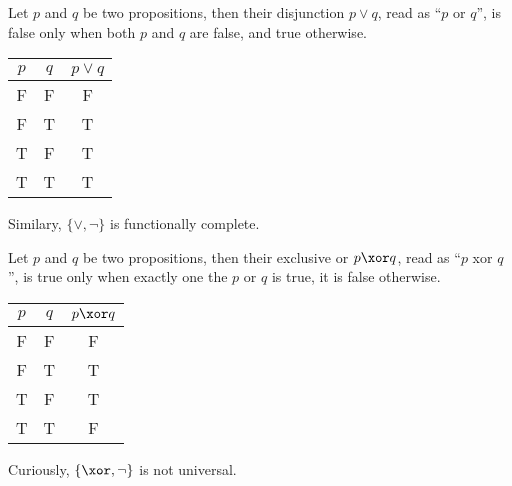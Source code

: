 \begin{definition}[Disjunction]
    Let \(p\) and \(q\) be two propositions, then their disjunction \(p \lor q\), read as ``\(p\) or \(q\)'', is false only when both \(p\) and \(q\) are false, and true otherwise.
    \begin{center}
        \begin{tabular}[c]{c  c | c}
            \(p\) & \(q\) & \(p \lor q\) \\ \hline
            F     & F     & F            \\
            F     & T     & T            \\
            T     & F     & T            \\
            T     & T     & T            \\
        \end{tabular}
    \end{center}
\end{definition}

Similary, \(\{\lor, \neg\}\) is functionally complete.

\begin{definition}[Exclusive or]
    Let \(p\) and \(q\) be two propositions, then their exclusive or \(p \xor q\), read as ``\(p\) xor \(q\)'', is true only when exactly one the \(p\) or \(q\) is true, it is false otherwise.
    \begin{center}
        \begin{tabular}[c]{c  c | c}
            \(p\) & \(q\) & \(p \xor q\) \\ \hline
            F     & F     & F            \\
            F     & T     & T            \\
            T     & F     & T            \\
            T     & T     & F            \\
        \end{tabular}
    \end{center}
\end{definition}

Curiously, \(\{\xor, \neg\}\) is not universal.